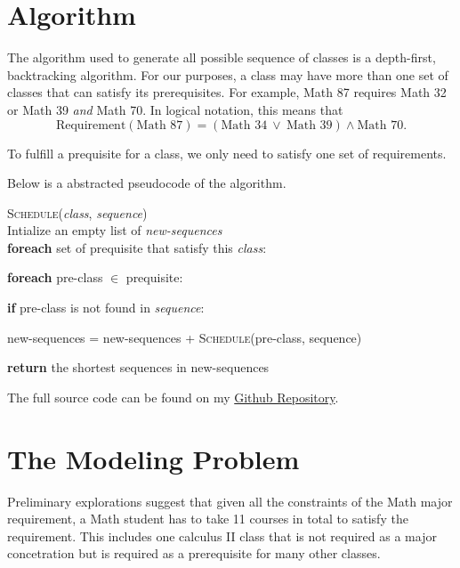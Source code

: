\documentclass[12pt, oneside]{article}
\begin{document}
\section{Algorithm}
The algorithm used to generate all possible sequence of classes is a depth-first, backtracking algorithm. For our purposes, a class may have more than one set of classes that can satisfy its prerequisites. For example, Math 87 requires Math 32 or Math 39 \textit{and} Math 70. In logical notation, this means that 
    \[
        \textrm{Requirement}(\textrm{Math 87}) = (\textrm{Math 34} \ \lor \ \textrm{Math 39}) \wedge \textrm{Math 70}.
    \]

To fulfill a prequisite for a class, we only need to satisfy one set of requirements.

\bigskip


Below is a abstracted pseudocode of the algorithm.

\bigskip



    \begin{addmargin}[1cm]{0em}
    \textsc{Schedule}(\textit{class}, \textit{sequence})\\
        Intialize an empty list of \textit{new-sequences} \\
        \textbf{foreach} set of prequisite that satisfy this \textit{class}:
            \begin{addmargin}[1cm]{0em}
                \textbf{foreach} pre-class $\in$ prequisite:
                \begin{addmargin}[1cm]{0em}
                    \textbf{if} pre-class is not found in \textit{sequence}:
                    \begin{addmargin}[1cm]{0em}
                        new-sequences = new-sequences + \textsc{Schedule}(pre-class, sequence)
                    \end{addmargin}
                \end{addmargin}

            \end{addmargin}

        \textbf{return} the shortest sequences in new-sequences
    \end{addmargin}

\bigskip
The full source code can be found on my \color{blue}\href{https://github.com/julie-jiang/graduation-scheduler}{Github Repository}\color{black}.

\section{The Modeling Problem}
Preliminary explorations suggest that given all the constraints of the Math major requirement, a Math student has to take 11 courses in total to satisfy the requirement. This includes one calculus II class that is not required as a major concetration but is required as a prerequisite for many other classes.
\end{document}

